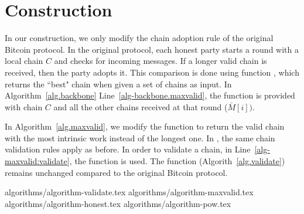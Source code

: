 \section{Construction}
In our construction, we only modify the chain adoption rule
of the original Bitcoin protocol.
In the original protocol, each honest party starts a round with a local chain
$C$ and checks for incoming messages. If a longer valid chain is received, then
the party adopts it. This comparison is done using function \maxvalid,
which returns the ``best" chain when given a set of chains as input.
In Algorithm~\ref{alg.backbone} Line~\ref{alg-backbone.maxvalid}, the
\maxvalid function is provided with chain $C$ and all the other chains received at that
round ($\bar M[i])$.

In Algorithm~\ref{alg.maxvalid}, we modify the \maxvalid function to return the valid
chain with the most intrinsic work instead of the longest one.
In \maxvalid, the same chain validation rules apply as before. In order to
validate a chain, in Line~\ref{alg-maxvalid:validate}, the \validate function is used.
The \validate function (Algorith~\ref{alg.validate}) remains unchanged compared to
the original Bitcoin protocol.


{algorithms/algorithm-validate.tex}
{algorithms/algorithm-maxvalid.tex}
{algorithms/algorithm-honest.tex}
{algorithms/algorithm-pow.tex}
